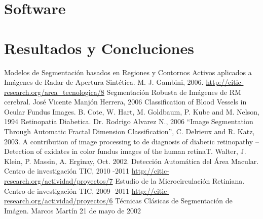 \documentclass[14pt]{article}
\begin{document}
\section{Software}
\section{Resultados y Concluciones}

\newpage
\begin{thebibliography}{1}
 	  Modelos de Segmentación basados en Regiones y Contornos Activos aplicados a Imágenes de Radar de Apertura Sintética. M. J. Gambini, 2006.
 	  \url{ http://citic-research.org/area_tecnologica/8}
 	 Segmentación Robusta de Imágenes de RM cerebral. José Vicente Manjón Herrera, 2006
	 Classification of Blood Vessels in Ocular Fundus Images. B. Cote, W. Hart, M. Goldbaum, P. Kube and M. Nelson, 1994
	Retinopatia Diabetica. Dr. Rodrigo Alvarez N., 2006
	  “Image Segmentation Through Automatic Fractal Dimension Classification”, C. Delrieux and R. Katz, 2003.
	 A contribution of image processing to de diagnosis of diabetic retinopathy – Detection of exidates in color fundus images of the human retinaT. Walter, J. Klein, P. Massin, A. Erginay, Oct. 2002.
	 Detección Automática del Área Macular. Centro de investigación TIC, 2010 -2011 \url{ http://citic-research.org/actividad/proyectos/7}
	Estudio de la Microcirculación Retiniana. Centro de investigación TIC, 2009 -2011 \url{ http://citic-research.org/actividad/proyectos/6}
	 Técnicas Clásicas de Segmentación de Imágen. Marcos Martín 21 de mayo de 2002

\end{thebibliography}
\end{document}
